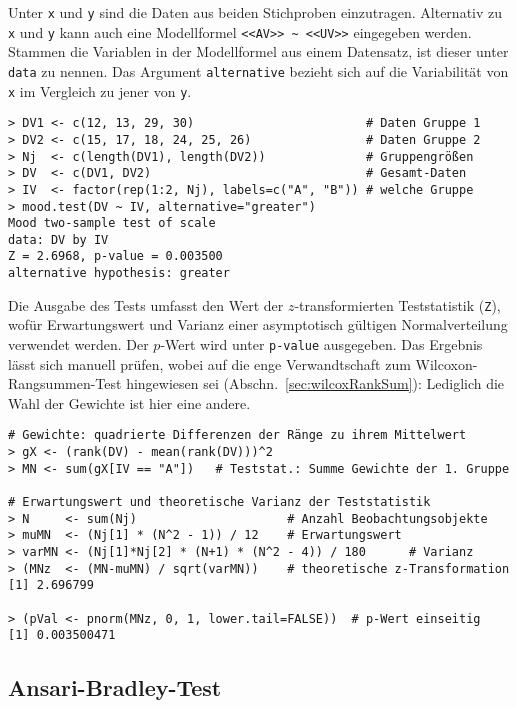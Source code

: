 Unter \lstinline!x! und \lstinline!y! sind die Daten aus beiden Stichproben einzutragen. Alternativ zu \lstinline!x! und \lstinline!y! kann auch eine Modellformel \lstinline!<<AV>> ~ <<UV>>! eingegeben werden. Stammen die Variablen in der Modellformel aus einem Datensatz, ist dieser unter \lstinline!data! zu nennen. Das Argument \lstinline!alternative! bezieht sich auf die Variabilität von \lstinline!x! im Vergleich zu jener von \lstinline!y!.

\begin{lstlisting}
> DV1 <- c(12, 13, 29, 30)                        # Daten Gruppe 1
> DV2 <- c(15, 17, 18, 24, 25, 26)                # Daten Gruppe 2
> Nj  <- c(length(DV1), length(DV2))              # Gruppengrößen
> DV  <- c(DV1, DV2)                              # Gesamt-Daten
> IV  <- factor(rep(1:2, Nj), labels=c("A", "B")) # welche Gruppe
> mood.test(DV ~ IV, alternative="greater")
Mood two-sample test of scale
data: DV by IV
Z = 2.6968, p-value = 0.003500
alternative hypothesis: greater
\end{lstlisting}

Die Ausgabe des Tests umfasst den Wert der $z$-transformierten Teststatistik (\lstinline!Z!), wofür Erwartungswert und Varianz einer asymptotisch gültigen Normalverteilung verwendet werden. Der $p$-Wert wird unter \lstinline!p-value! ausgegeben. Das Ergebnis lässt sich manuell prüfen, wobei auf die enge Verwandtschaft zum Wilcoxon-Rangsummen-Test hingewiesen sei (Abschn.\ \ref{sec:wilcoxRankSum}): Lediglich die Wahl der Gewichte ist hier eine andere.
\begin{lstlisting}
# Gewichte: quadrierte Differenzen der Ränge zu ihrem Mittelwert
> gX <- (rank(DV) - mean(rank(DV)))^2
> MN <- sum(gX[IV == "A"])   # Teststat.: Summe Gewichte der 1. Gruppe

# Erwartungswert und theoretische Varianz der Teststatistik
> N     <- sum(Nj)                     # Anzahl Beobachtungsobjekte
> muMN  <- (Nj[1] * (N^2 - 1)) / 12    # Erwartungswert
> varMN <- (Nj[1]*Nj[2] * (N+1) * (N^2 - 4)) / 180      # Varianz
> (MNz  <- (MN-muMN) / sqrt(varMN))    # theoretische z-Transformation
[1] 2.696799

> (pVal <- pnorm(MNz, 0, 1, lower.tail=FALSE))  # p-Wert einseitig
[1] 0.003500471
\end{lstlisting}

\subsection{Ansari-Bradley-Test}

